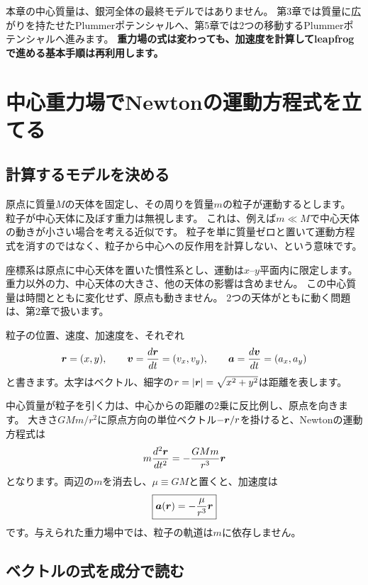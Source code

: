 本章の中心質量は、銀河全体の最終モデルではありません。
第3章では質量に広がりを持たせたPlummerポテンシャルへ、第5章では2つの移動するPlummerポテンシャルへ進みます。
\textbf{重力場の式は変わっても、加速度を計算してleapfrogで進める基本手順は再利用します。}

\section{中心重力場でNewtonの運動方程式を立てる}
\label{sec:ch1-gravity}

\subsection{計算するモデルを決める}

原点に質量$M$の天体を固定し、その周りを質量$m$の粒子が運動するとします。
粒子が中心天体に及ぼす重力は無視します。
これは、例えば$m\ll M$で中心天体の動きが小さい場合を考える近似です。
粒子を単に質量ゼロと置いて運動方程式を消すのではなく、粒子から中心への反作用を計算しない、という意味です。

座標系は原点に中心天体を置いた慣性系とし、運動は$x$--$y$平面内に限定します。
重力以外の力、中心天体の大きさ、他の天体の影響は含めません。
この中心質量は時間とともに変化せず、原点も動きません。
2つの天体がともに動く問題は、第2章で扱います。

粒子の位置、速度、加速度を、それぞれ
\begin{equation}
\boldsymbol r=(x,y),\qquad \boldsymbol v=\frac{d\boldsymbol r}{dt}=(v_x,v_y),\qquad
\boldsymbol a=\frac{d\boldsymbol v}{dt}=(a_x,a_y)
\label{eq:ch1-vectors}
\end{equation}
と書きます。太字はベクトル、細字の$r=|\boldsymbol r|=\sqrt{x^2+y^2}$は距離を表します。

中心質量が粒子を引く力は、中心からの距離の2乗に反比例し、原点を向きます。
大きさ$GMm/r^2$に原点方向の単位ベクトル$-\boldsymbol r/r$を掛けると、Newtonの運動方程式は
\begin{equation}
m\frac{d^2\boldsymbol r}{dt^2}=-\frac{GMm}{r^3}\boldsymbol r
\label{eq:ch1-newton-mass}
\end{equation}
となります。両辺の$m$を消去し、$\mu\equiv GM$と置くと、加速度は
\begin{equation}
\boxed{\boldsymbol a(\boldsymbol r)=-\frac{\mu}{r^3}\boldsymbol r}
\label{eq:ch1-kepler-acceleration}
\end{equation}
です。与えられた重力場中では、粒子の軌道は$m$に依存しません。

\subsection{ベクトルの式を成分で読む}

